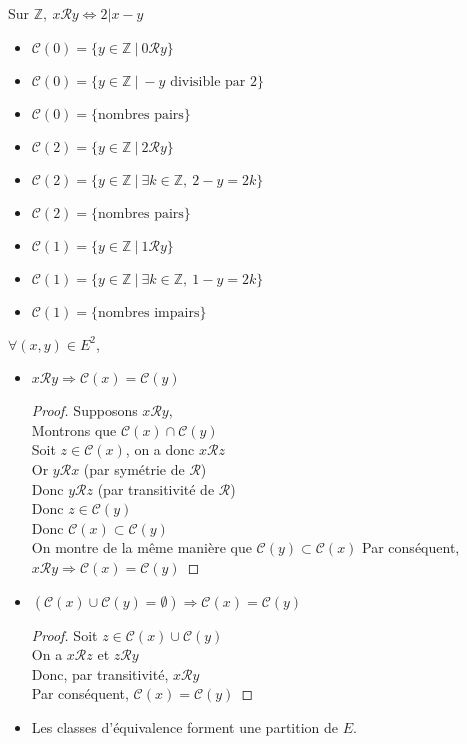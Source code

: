 \documentclass[../main.tex]{subfile}
\begin{document}
\begin{ex}
	Sur $\mathbb{Z}, \ x \mathcal{R} y \Leftrightarrow 2 | x-y$\\
	\begin{itemize}
		\item $\mathcal{C}(0) = \{y \in \mathbb{Z} \ | \ 0 \mathcal{R} y\}$
		\item $\mathcal{C}(0) = \{y \in \mathbb{Z} \ | \ -y \text{ divisible par } 2\}$
		\item $\mathcal{C}(0) = \{\text{nombres pairs}\}$
		\item $\mathcal{C}(2) = \{y \in \mathbb{Z} \ | \ 2 \mathcal{R} y\}$
		\item $\mathcal{C}(2) = \{y \in \mathbb{Z} \ | \ \exists k \in \mathbb{Z} , \ 2-y = 2 k\}$
		\item $\mathcal{C}(2) = \{\text{nombres pairs}\}$
		\item $\mathcal{C}(1) = \{y \in \mathbb{Z} \ | \ 1 \mathcal{R} y\}$
		\item $\mathcal{C}(1) = \{y \in \mathbb{Z} \ | \ \exists k \in \mathbb{Z} , \ 1-y = 2 k\}$
		\item $\mathcal{C}(1) = \{\text{nombres impairs}\}$
	\end{itemize}
\end{ex}

\begin{prop}
	$\forall (x, y) \in E^2$, \\
	\begin{itemize}
		\item $x \mathcal{R} y \Rightarrow \mathcal{C}(x) = \mathcal{C}(y)$
		\begin{proof}
			Supposons $x \mathcal{R} y$, \\
			Montrons que $\mathcal{C}(x) \cap \mathcal{C}(y)$\\
			Soit $z \in \mathcal{C}(x)$, on a donc $x \mathcal{R} z$\\
			Or $y \mathcal{R} x$ (par symétrie de $\mathcal{R}$)\\
			Donc $y \mathcal{R} z$ (par transitivité de $\mathcal{R}$)\\
			Donc $z \in \mathcal{C}(y)$\\
			Donc $\mathcal{C}(x) \subset \mathcal{C}(y)$\\
			On montre de la même manière que $\mathcal{C}(y) \subset \mathcal{C}(x)$
			Par conséquent, $x \mathcal{R} y \Rightarrow \mathcal{C}(x) = \mathcal{C}(y)$
		\end{proof}
		\item $(\mathcal{C}(x) \cup \mathcal{C}(y) = \emptyset) \Rightarrow \mathcal{C}(x) = \mathcal{C}(y)$
		\begin{proof}
			Soit $z \in \mathcal{C}(x) \cup \mathcal{C}(y)$\\
			On a $x \mathcal{R} z$ et $z \mathcal{R} y$\\
			Donc, par transitivité, $x \mathcal{R} y$ \\
			Par conséquent, $\mathcal{C}(x) = \mathcal{C}(y)$
		\end{proof}
		\item Les classes d'équivalence forment une partition de $E$.
	\end{itemize}
\end{prop}
\end{document}

